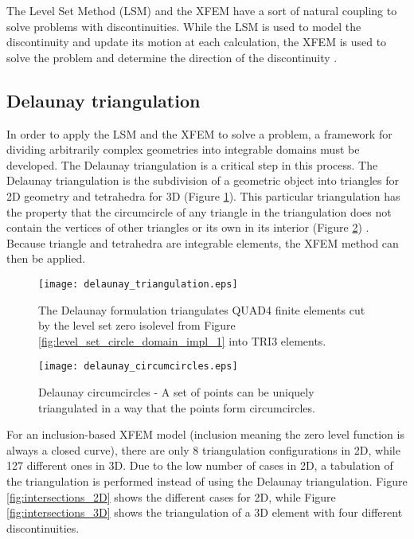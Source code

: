 The Level Set Method (LSM) and the XFEM have a sort of natural coupling to solve problems with discontinuities. While the LSM is used to model the discontinuity and update its motion at each calculation, the XFEM is used to solve the problem and determine the direction of the discontinuity \citep{SCM+:01}.


\subsection{Delaunay triangulation}

In order to apply the LSM and the XFEM to solve a problem, a framework for dividing arbitrarily complex geometries into integrable domains must be developed. The Delaunay triangulation is a critical step in this process. The Delaunay triangulation is the subdivision of a geometric object into triangles for 2D geometry and tetrahedra for 3D (Figure \ref{fig:Delaunay-Triangulation}). This particular triangulation has the property that the circumcircle of any triangle in the triangulation does not contain the vertices of other triangles or its own in its interior (Figure \ref{fig:Delaunay-Circumcircles}) \citep{LS:80}. Because triangle and tetrahedra are integrable elements, the XFEM method can then be applied.

\begin{figure}[htbp]
	\centering
		\texttt{[image: delaunay\_triangulation.eps]}
	\caption[Delaunay triangulation]{The Delaunay formulation triangulates QUAD4 finite elements cut by the level set zero isolevel from Figure \ref{fig:level_set_circle_domain_impl_1} into TRI3 elements.}
	\label{fig:Delaunay-Triangulation}
\end{figure}

\begin{figure}[htbp]
	\centering
	\texttt{[image: delaunay\_circumcircles.eps]}
	\caption[Delaunay circumcircles]{Delaunay circumcircles - A set of points can be uniquely triangulated in a way that the points form circumcircles.}
	\label{fig:Delaunay-Circumcircles}
\end{figure}

For an inclusion-based XFEM model (inclusion meaning the zero level function is always a closed curve), there are only 8 triangulation configurations in 2D, while 127 different ones in 3D. Due to the low number of cases in 2D, a tabulation of the triangulation is performed instead of using the Delaunay triangulation. Figure \ref{fig:intersections_2D} shows the different cases for 2D, while Figure \ref{fig:intersections_3D} shows the triangulation of a 3D element with four different discontinuities.

